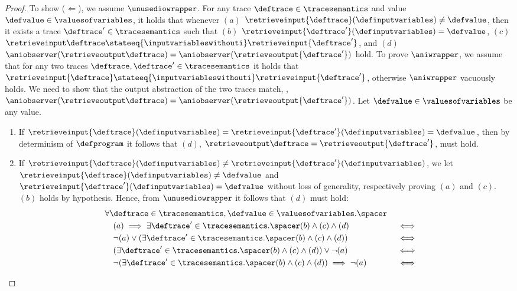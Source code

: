 \begin{proof}
  To show ($\Leftarrow$), we assume $\unusediowrapper$.
  For any trace $\deftrace\in\tracesemantics$ and value $\defvalue\in\valuesofvariables$, it holds that whenever $(a)$ $\retrieveinput{\deftrace}(\definputvariables) \neq \defvalue$, then it exists a trace $\deftrace'\in\tracesemantics$ such that $(b)$ $\retrieveinput{\deftrace'}(\definputvariables) = \defvalue$, $(c)$ $\retrieveinput\deftrace \stateeq{\inputvariableswithouti} \retrieveinput{\deftrace'}$, and $(d)$ $\aniobserver(\retrieveoutput\deftrace) = \aniobserver(\retrieveoutput{\deftrace'})$ hold.
  To prove $\aniwrapper$, we assume that for any two traces $\deftrace, \deftrace'\in\tracesemantics$ it holds that $\retrieveinput{\deftrace} \stateeq{\inputvariableswithouti} \retrieveinput{\deftrace'}$, otherwise $\aniwrapper$ vacuously holds. We need to show that the output abstraction of the two traces match, \ie, $\aniobserver(\retrieveoutput\deftrace) = \aniobserver(\retrieveoutput{\deftrace'})$.
  Let $\defvalue\in\valuesofvariables$ be any value.
  \begin{enumerate}
    \item If $\retrieveinput{\deftrace}(\definputvariables) = \retrieveinput{\deftrace'}(\definputvariables) = \defvalue$, then by determinism of $\defprogram$ it follows that $(d)$, \cf{} $\retrieveoutput\deftrace = \retrieveoutput{\deftrace'}$, must hold.
    \item If $\retrieveinput{\deftrace}(\definputvariables) \neq \retrieveinput{\deftrace'}(\definputvariables)$, we let $\retrieveinput{\deftrace}(\definputvariables) \neq \defvalue$ and $\retrieveinput{\deftrace'}(\definputvariables) = \defvalue$ without loss of generality, respectively proving $(a)$ and $(c)$. $(b)$ holds by hypothesis. Hence, from $\unusediowrapper$ it follows that $(d)$ must hold:
    \begin{align*}
      &\forall \deftrace\in\tracesemantics, \defvalue\in\valuesofvariables.\spacer \\
      &\quad (a) \implies \exists \deftrace'\in\tracesemantics.\spacer (b) \land (c) \land (d) && \iff \\
      &\quad \neg(a) \lor (\exists \deftrace'\in\tracesemantics.\spacer (b) \land (c) \land (d)) && \iff \\
      &\quad (\exists \deftrace'\in\tracesemantics.\spacer (b) \land (c) \land (d)) \lor \neg(a) && \iff \\
      &\quad  \neg(\exists \deftrace'\in\tracesemantics.\spacer (b) \land (c) \land (d)) \implies \neg(a) && \iff \\

\end{align*}
\end{enumerate}
\end{proof}
